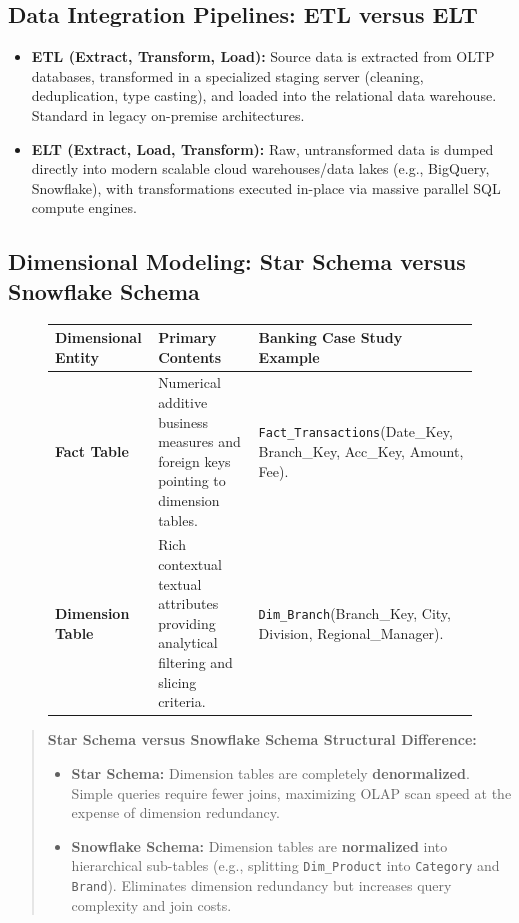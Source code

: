 \subsection{Data Integration Pipelines: ETL versus ELT}
\begin{itemize}
    \item \textbf{ETL (Extract, Transform, Load):} Source data is extracted from OLTP databases, transformed in a specialized staging server (cleaning, deduplication, type casting), and loaded into the relational data warehouse. Standard in legacy on-premise architectures.
    \item \textbf{ELT (Extract, Load, Transform):} Raw, untransformed data is dumped directly into modern scalable cloud warehouses/data lakes (e.g., BigQuery, Snowflake), with transformations executed in-place via massive parallel SQL compute engines.
\end{itemize}

\subsection{Dimensional Modeling: Star Schema versus Snowflake Schema}
\begin{figure}[htbp]
\centering
\small
\begin{tabularx}{\textwidth}{l p{3.2cm} X}
\toprule
\textbf{Dimensional Entity} & \textbf{Primary Contents} & \textbf{Banking Case Study Example} \\
\midrule
\textbf{Fact Table} & Numerical additive business measures and foreign keys pointing to dimension tables. & \texttt{Fact\_Transactions}(Date\_Key, Branch\_Key, Acc\_Key, Amount, Fee). \\
\textbf{Dimension Table} & Rich contextual textual attributes providing analytical filtering and slicing criteria. & \texttt{Dim\_Branch}(Branch\_Key, City, Division, Regional\_Manager). \\
\bottomrule
\end{tabularx}
\end{figure}

\begin{quote}
\textbf{Star Schema versus Snowflake Schema Structural Difference:}
\begin{itemize}
    \item \textbf{Star Schema:} Dimension tables are completely \textbf{denormalized}. Simple queries require fewer joins, maximizing OLAP scan speed at the expense of dimension redundancy.
    \item \textbf{Snowflake Schema:} Dimension tables are \textbf{normalized} into hierarchical sub-tables (e.g., splitting \texttt{Dim\_Product} into \texttt{Category} and \texttt{Brand}). Eliminates dimension redundancy but increases query complexity and join costs.
\end{itemize}
\end{quote}


